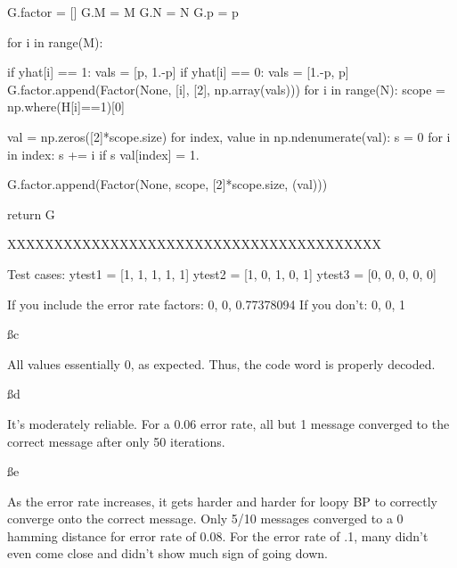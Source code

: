     G.factor = []
    G.M = M
    G.N = N
    G.p = p

    for i in range(M):

        if yhat[i] == 1:
            vals = [p, 1.-p]
        if yhat[i] == 0:
            vals = [1.-p, p]
        G.factor.append(Factor(None, [i], [2], np.array(vals)))
    for i in range(N):
        scope = np.where(H[i]==1)[0]

        val = np.zeros([2]*scope.size)
        for index, value in np.ndenumerate(val):
            s = 0
            for i in index:
                s += i
            if s%
                val[index] = 1.

        G.factor.append(Factor(None, scope, [2]*scope.size, (val)))

    return G
    
XXXXXXXXXXXXXXXXXXXXXXXXXXXXXXXXXXXXXXXX

Test cases:
ytest1 = [1, 1, 1, 1, 1]
ytest2 = [1, 0, 1, 0, 1]
ytest3 = [0, 0, 0, 0, 0]

If you include the error rate factors:
0, 0, 0.77378094
If you don't: 
0, 0, 1

\ss c

All values essentially 0, as expected. Thus, the code word is properly decoded.


\ss d

It's moderately reliable. For a 0.06 error rate, all but 1 message converged to the correct message after only 50 iterations.


\ss e

As the error rate increases, it gets harder and harder for loopy BP to correctly converge onto the correct message. Only 5/10 messages converged to a 0 hamming distance for error rate of 0.08. For the error rate of .1, many didn't even come close and didn't show much sign of going down.


